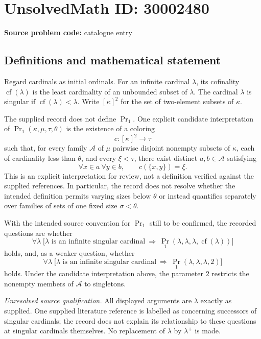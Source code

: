 \documentclass[11pt]{article}
\begin{document}
\section*{UnsolvedMath ID: 30002480}
\textbf{Source problem code:} catalogue entry
\subsection{Definitions and mathematical statement}
Regard cardinals as initial ordinals. For an infinite cardinal $\lambda$, its cofinality $\operatorname{cf}(\lambda)$ is the least cardinality of an unbounded subset of $\lambda$. The cardinal $\lambda$ is singular if $\operatorname{cf}(\lambda)<\lambda$. Write $[\kappa]^2$ for the set of two-element subsets of $\kappa$.

The supplied record does not define $\operatorname{Pr}_1$. One explicit candidate interpretation of $\operatorname{Pr}_1(\kappa,\mu,\tau,\theta)$ is the existence of a coloring
\[
c:[\kappa]^2\longrightarrow\tau
\]
such that, for every family $\mathcal A$ of $\mu$ pairwise disjoint nonempty subsets of $\kappa$, each of cardinality less than $\theta$, and every $\xi<\tau$, there exist distinct $a,b\in\mathcal A$ satisfying
\[
\forall x\in a\ \forall y\in b,\qquad c(\{x,y\})=\xi.
\]
This is an explicit interpretation for review, not a definition verified against the supplied references. In particular, the record does not resolve whether the intended definition permits varying sizes below $\theta$ or instead quantifies separately over families of sets of one fixed size $\sigma<\theta$.

With the intended source convention for $\operatorname{Pr}_1$ still to be confirmed, the recorded questions are whether
\[
\forall\lambda\;\bigl[\lambda\text{ is an infinite singular cardinal}\ \Longrightarrow\ \operatorname{Pr}_1(\lambda,\lambda,\lambda,\operatorname{cf}(\lambda))\bigr]
\]
holds, and, as a weaker question, whether
\[
\forall\lambda\;\bigl[\lambda\text{ is an infinite singular cardinal}\ \Longrightarrow\ \operatorname{Pr}_1(\lambda,\lambda,\lambda,2)\bigr]
\]
holds. Under the candidate interpretation above, the parameter $2$ restricts the nonempty members of $\mathcal A$ to singletons.

\textit{Unresolved source qualification.} All displayed arguments are $\lambda$ exactly as supplied. One supplied literature reference is labelled as concerning successors of singular cardinals; the record does not explain its relationship to these questions at singular cardinals themselves. No replacement of $\lambda$ by $\lambda^+$ is made.
\end{document}

